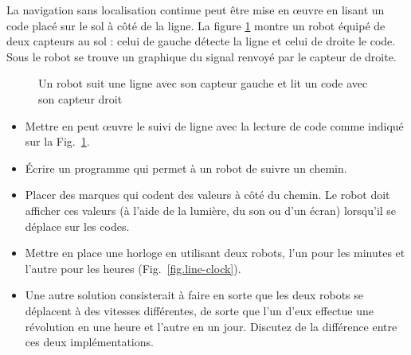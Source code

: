 La navigation sans localisation continue peut être mise en œuvre en lisant un code placé sur le sol à côté de la ligne. La figure \ref{fig.code-line} montre un robot équipé de deux capteurs au sol : celui de gauche détecte la ligne et celui de droite le code. Sous le robot se trouve un graphique du signal renvoyé par le capteur de droite.

\begin{figure}
\begin{center}
\end{center}
\caption{Un robot suit une ligne avec son capteur gauche et lit un code avec son capteur droit}\label{fig.code-line}
\end{figure}

\begin{framed}
\begin{itemize}
\item Mettre en peut œuvre le suivi de ligne avec la lecture de code comme indiqué sur la Fig.~\ref{fig.code-line}.
\item Écrire un programme qui permet à un robot de suivre un chemin.
\item Placer des marques qui codent des valeurs à côté du chemin. Le robot doit afficher ces valeurs (à l'aide de la lumière, du son ou d'un écran) lorsqu'il se déplace sur les codes.
\end{itemize}
\end{framed}

\begin{framed}
\begin{itemize}
\item Mettre en place une horloge en utilisant deux robots, l'un pour les minutes et l'autre pour les heures (Fig.~\ref{fig.line-clock}).
\item Une autre solution consisterait à faire en sorte que les deux robots se déplacent à des vitesses différentes, de sorte que l'un d'eux effectue une révolution en une heure et l'autre en un jour. Discutez de la différence entre ces deux implémentations.
\end{itemize}
\end{framed}

